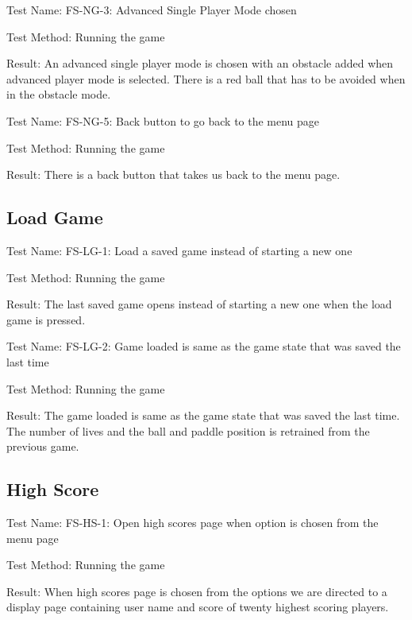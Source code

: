 \documentclass{article}
\begin{document}
\vspace{5mm}

Test Name: FS-NG-3: Advanced Single Player Mode chosen \par
Test Method: Running the game \par
Result: An advanced single player mode is chosen with an obstacle added when advanced player mode is selected. There is a red ball that has to be avoided when in the obstacle mode. \par

\vspace{5mm}

Test Name: FS-NG-5: Back button to go back to the menu page \par
Test Method: Running the game \par
Result: There is a back button that takes us back to the menu page. \par

\vspace{5mm}


\subsection {Load Game}
Test Name: FS-LG-1: Load a saved game instead of starting a new one \par
Test Method: Running the game \par
Result: The last saved game opens instead of starting a new one when the load game is pressed. \par

\vspace{5mm}


Test Name: FS-LG-2: Game loaded is same as the game state that was saved the last time \par
Test Method: Running the game \par
Result: The game loaded is same as the game state that was saved the last time. The number of lives and the ball and paddle position is retrained from the previous game. \par

\vspace{5mm}


\subsection {High Score} 
Test Name: FS-HS-1: Open high scores page when option is chosen from the menu page \par
Test Method: Running the game \par
Result: When high scores page is chosen from the options we are directed to a display page containing user name and score of twenty highest scoring players. \par
\end{document}
